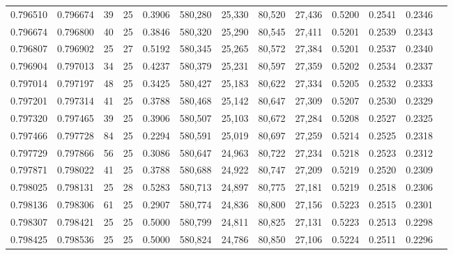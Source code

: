 \begin{tabular}{rrrrrrrrrrrrr}
0.796510 & 0.796674 &    39 &  25 &                                     0.3906 & 580,280 &  25,330 &  80,520 &  27,436 & 0.5200 & 0.2541 & 0.2346 \\
0.796674 & 0.796800 &    40 &  25 &                                     0.3846 & 580,320 &  25,290 &  80,545 &  27,411 & 0.5201 & 0.2539 & 0.2343 \\
0.796807 & 0.796902 &    25 &  27 &                                     0.5192 & 580,345 &  25,265 &  80,572 &  27,384 & 0.5201 & 0.2537 & 0.2340 \\
0.796904 & 0.797013 &    34 &  25 &                                     0.4237 & 580,379 &  25,231 &  80,597 &  27,359 & 0.5202 & 0.2534 & 0.2337 \\
0.797014 & 0.797197 &    48 &  25 &                                     0.3425 & 580,427 &  25,183 &  80,622 &  27,334 & 0.5205 & 0.2532 & 0.2333 \\
0.797201 & 0.797314 &    41 &  25 &                                     0.3788 & 580,468 &  25,142 &  80,647 &  27,309 & 0.5207 & 0.2530 & 0.2329 \\
0.797320 & 0.797465 &    39 &  25 &                                     0.3906 & 580,507 &  25,103 &  80,672 &  27,284 & 0.5208 & 0.2527 & 0.2325 \\
0.797466 & 0.797728 &    84 &  25 &                                     0.2294 & 580,591 &  25,019 &  80,697 &  27,259 & 0.5214 & 0.2525 & 0.2318 \\
0.797729 & 0.797866 &    56 &  25 &                                     0.3086 & 580,647 &  24,963 &  80,722 &  27,234 & 0.5218 & 0.2523 & 0.2312 \\
0.797871 & 0.798022 &    41 &  25 &                                     0.3788 & 580,688 &  24,922 &  80,747 &  27,209 & 0.5219 & 0.2520 & 0.2309 \\
0.798025 & 0.798131 &    25 &  28 &                                     0.5283 & 580,713 &  24,897 &  80,775 &  27,181 & 0.5219 & 0.2518 & 0.2306 \\
0.798136 & 0.798306 &    61 &  25 &                                     0.2907 & 580,774 &  24,836 &  80,800 &  27,156 & 0.5223 & 0.2515 & 0.2301 \\
0.798307 & 0.798421 &    25 &  25 &                                     0.5000 & 580,799 &  24,811 &  80,825 &  27,131 & 0.5223 & 0.2513 & 0.2298 \\
0.798425 & 0.798536 &    25 &  25 &                                     0.5000 & 580,824 &  24,786 &  80,850 &  27,106 & 0.5224 & 0.2511 & 0.2296 \\

\end{tabular}
